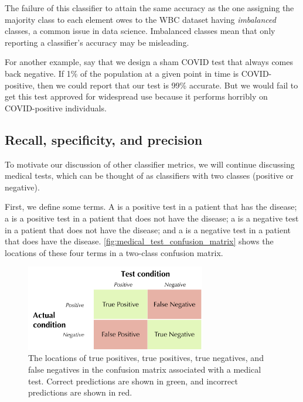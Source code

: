 The failure of this classifier to attain the same accuracy as the one assigning the majority class to each element owes to the WBC dataset having \textit{imbalanced} classes, a common issue in data science. Imbalanced classes mean that only reporting a classifier's accuracy may be misleading.

For another example, say that we design a sham COVID test that always comes back negative. If 1\% of the population at a given point in time is COVID-positive, then we could report that our test is 99\% accurate. But we would fail to get this test approved for widespread use because it performs horribly on COVID-positive individuals.\\

\begin{qbox}\end{qbox}

\FloatBarrier
{}
\subsection{Recall, specificity, and precision}

To motivate our discussion of other classifier metrics, we will continue discussing medical tests, which can be thought of as classifiers with two classes (positive or negative).

First, we define some terms. A  is a positive test in a patient that has the disease; a  is a positive test in a patient that does not have the disease; a  is a negative test in a patient that does not have the disease; and a  is a negative test in a patient that does have the disease. \autoref{fig:medical_test_confusion_matrix} shows the locations of these four terms in a two-class confusion matrix.\\

\begin{figure}[h]
\centering
\mySfFamily
\includegraphics[width = 0.7\textwidth]{../images/medical_test_confusion_matrix.png}
\caption{The locations of true positives, true positives, true negatives, and false negatives in the confusion matrix associated with a medical test. Correct predictions are shown in green, and incorrect predictions are shown in red.}
\label{fig:medical_test_confusion_matrix}
\end{figure}

